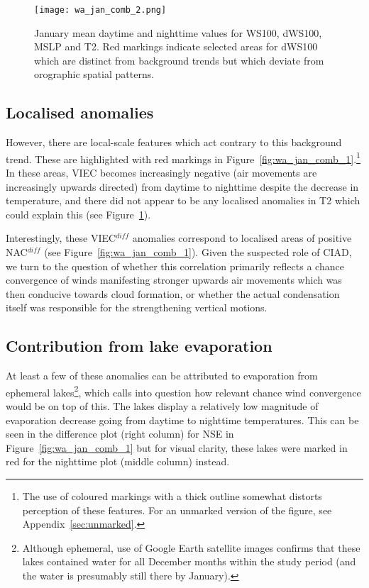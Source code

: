 \begin{figure}[!ht]
	\centering
	\texttt{[image: wa\_jan\_comb\_2.png]}
	\caption[January means for selected variables 2]{January mean daytime and nighttime values for \acs{WS100}, \acs{dWS100}, \acs{MSLP} and \acs{T2}. Red markings indicate selected areas for \acs{dWS100} which are distinct from background trends but which deviate from orographic spatial patterns.}
	\label{fig:wa_jan_comb_2}
\end{figure}

\subsection{Localised anomalies}

However, there are local-scale features which act contrary to this background trend. These are highlighted with red markings in Figure~\ref{fig:wa_jan_comb_1}.\footnote{The use of coloured markings with a thick outline somewhat distorts perception of these features. For an unmarked version of the figure, see Appendix~\ref{sec:unmarked}.} In these areas, \ac{VIEC} becomes increasingly negative (air movements are increasingly upwards directed) from daytime to nighttime despite the decrease in temperature, and there did not appear to be any localised anomalies in \ac{T2} which could explain this (see Figure~\ref{fig:wa_jan_comb_2}).

Interestingly, these \ac{VIEC}$^{diff}$ anomalies correspond to localised areas of positive \ac{NAC}$^{diff}$ (see Figure~\ref{fig:wa_jan_comb_1}). Given the suspected role of \ac{CIAD}, we turn to the question of whether this correlation primarily reflects a chance convergence of winds manifesting stronger upwards air movements which was then conducive towards cloud formation, or whether the actual condensation itself was responsible for the strengthening vertical motions.

\subsection{Contribution from lake evaporation}

At least a few of these anomalies can be attributed to evaporation from ephemeral lakes\footnote{Although ephemeral, use of Google Earth satellite images confirms that these lakes contained water for all December months within the study period (and the water is presumably still there by January).}, which calls into question how relevant chance wind convergence would be on top of this. The lakes display a relatively low magnitude of evaporation decrease going from daytime to nighttime temperatures. This can be seen in the difference plot (right column) for \ac{NSE} in Figure~\ref{fig:wa_jan_comb_1} but for visual clarity, these lakes were marked in red for the nighttime plot (middle column) instead.

